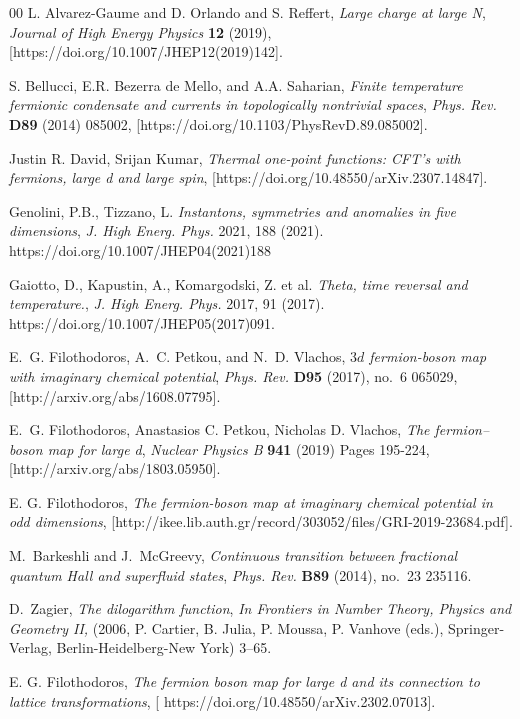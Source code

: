 \documentclass[twoside]{article}
\begin{document}
\begin{thebibliography}{00}
L. Alvarez-Gaume and D. Orlando and S. Reffert, {\it Large charge at large N}, {\em Journal of High Energy Physics} {\bf 12} (2019), [{https://doi.org/10.1007/JHEP12(2019)142}].
  
S. Bellucci, E.R. Bezerra de Mello, and A.A. Saharian, {\it {Finite temperature fermionic condensate and currents in topologically nontrivial spaces}}, {\em Phys. Rev.} {\bf D89} (2014) 085002, [{https://doi.org/10.1103/PhysRevD.89.085002}].

Justin R. David, Srijan Kumar, {\it {Thermal one-point functions: CFT’s with fermions, large d and large spin}}, [{https://doi.org/10.48550/arXiv.2307.14847}].
  
Genolini, P.B., Tizzano, L. {\it {Instantons, symmetries and anomalies in five dimensions}}, {\em J. High Energ. Phys.} 2021, 188 (2021). https://doi.org/10.1007/JHEP04(2021)188

Gaiotto, D., Kapustin, A., Komargodski, Z. et al. {\it {Theta, time reversal and temperature}.}, {\em J. High Energ. Phys.} 2017, 91 (2017). https://doi.org/10.1007/JHEP05(2017)091.

E.~G. Filothodoros, A.~C. Petkou, and N.~D. Vlachos, {\it {$3d$ fermion-boson map with imaginary chemical potential}}, {\em Phys. Rev.} {\bf D95} (2017),
  no.~6 065029, [{http://arxiv.org/abs/1608.07795}].

E.~G. Filothodoros, Anastasios C. Petkou, Nicholas D. Vlachos,
{\it {The fermion–boson map for large d}},
{\em Nuclear Physics B}
{\bf 941} (2019) Pages 195-224,[{http://arxiv.org/abs/1803.05950}].

E. G. Filothodoros, {\it {The fermion-boson map at imaginary chemical potential in odd dimensions}}, [{http://ikee.lib.auth.gr/record/303052/files/GRI-2019-23684.pdf}].

M.~Barkeshli and J.~McGreevy, {\it {Continuous transition between fractional
  quantum Hall and superfluid states}}, {\em Phys. Rev.} {\bf B89} (2014),
  no.~23 235116.

D.~Zagier, {\it The dilogarithm function}, {\em In Frontiers in Number Theory,
  Physics and Geometry II,} (2006, P. Cartier, B. Julia, P. Moussa, P. Vanhove
  (eds.), Springer-Verlag, Berlin-Heidelberg-New York) 3--65.

E. G. Filothodoros, {\it {The fermion boson map for large d and its connection to lattice transformations}}, [{
https://doi.org/10.48550/arXiv.2302.07013}].



\end{thebibliography}
\end{document}
